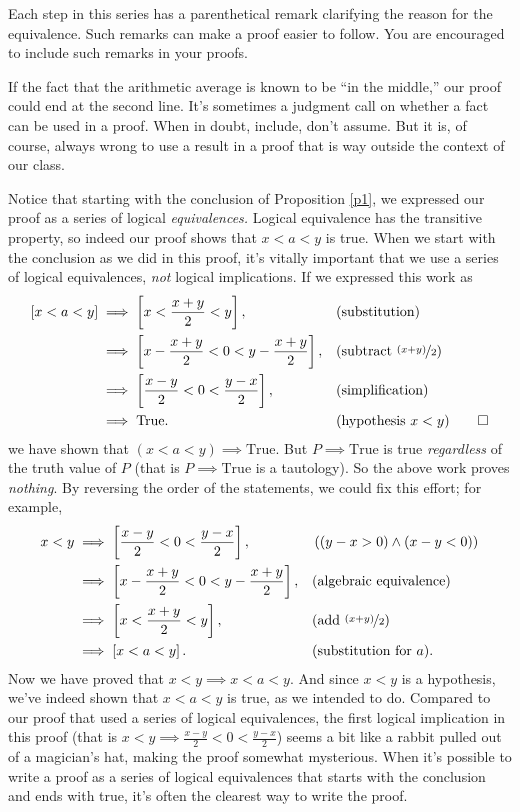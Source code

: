 \documentclass[12pt,fleqn,answers]{article}
\newcommand{\true}{\mathrm{True}}
\begin{document}
Each step in this series has a parenthetical remark clarifying the reason for the equivalence. 
Such remarks can make a proof easier to follow. You are encouraged
to include such remarks in your proofs.

If the fact that the arithmetic average is known to be ``in the middle,'' our proof could end at 
the second line. It's sometimes a judgment call on whether a fact can be used in a proof. When in doubt, include, don't assume.
But it is, of course, always wrong to use a result in a proof  that is way outside the context of our class.

Notice that starting with the conclusion of Proposition \ref{p1}, we expressed our proof as a series of logical \emph{equivalences.}  Logical
equivalence has the transitive property, so indeed our proof shows that $x < a < y$ is true.  
When we start with the conclusion as we did in this proof, it's vitally important that we use a series of  logical equivalences, \emph{not}
logical implications. If we expressed this work as
 \begin{align*}
      \left[ x < a < y \right] 
          &\implies \left[ x < \frac{x+y}{2} < y \right], &&\text{(substitution)} \\
          & \implies  \left[ x - \frac{x+y}{2} < 0 < y - \frac{x+y}{2}  \right], &&\text{(subtract $\nicefrac{(x+y)}{2}$)} \\
          & \implies  \left[ \frac{x-y}{2} < 0 < \frac{y-x}{2}  \right], &&\text{(simplification)} \\
          & \implies \true. && \text{(hypothesis $x < y$)} \qedhere
    \end{align*} 
we have shown that  $(x < a < y) \implies \true$. But $P \implies \true$ is
true \emph{regardless} of the truth value of $P$ (that is $P \implies \true$ is a 
tautology). So the above work proves \emph{nothing}. By reversing the order of the statements,
we could fix this effort; for example,
 \begin{align*}
    x < y  &\implies  \left[ \frac{x-y}{2} < 0 < \frac{y-x}{2}  \right], && \left((y-x > 0) \land  (x-y < 0) \right) \\
             &\implies   \left[ x - \frac{x+y}{2} < 0 < y - \frac{x+y}{2}  \right], &&\text{(algebraic equivalence)} \\
             &\implies \left[ x < \frac{x+y}{2} < y  \right], &&\text{(add $\nicefrac{(x+y)}{2}$)} \\
             &\implies \left[ x < a < y  \right].  &&\text{(substitution for $a$)}.
 \end{align*} 
Now we have proved that $x < y \implies x < a < y  $. And since $x < y$ is a hypothesis, we've indeed shown that $ x < a < y $ is true,
as we intended to do. Compared to our proof that used a series of logical equivalences,  the first logical implication in this proof 
(that is $x < y \implies 
 \frac{x-y}{2} < 0 < \frac{y-x}{2} $) seems a bit like a rabbit pulled out of a magician's hat, making the proof somewhat mysterious.
 When it's possible to write a proof as a series of logical equivalences that starts with the conclusion and ends with true, it's often 
 the clearest way to write the proof. 
\end{document}
